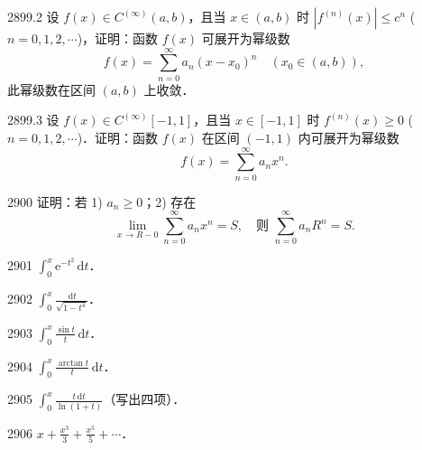 \begin{prob}[M]{2899.2}
设 $f(x) \in C^{(\infty)}(a, b)$，且当 $x \in (a, b)$ 时 $|f^{(n)}(x)| \leqslant c^n$ ($n = 0, 1, 2, \cdots$)，证明：函数 $f(x)$ 可展开为幂级数
\[
f(x) = \sum_{n=0}^{\infty} a_n (x - x_0)^n \quad (x_0 \in (a, b)),
\]
此幂级数在区间 $(a, b)$ 上收敛．
\end{prob}

\begin{prob}[M]{2899.3}
设 $f(x) \in C^{(\infty)}[-1, 1]$，且当 $x \in [-1, 1]$ 时 $f^{(n)}(x) \geqslant 0$ ($n = 0, 1, 2, \cdots$)．证明：函数 $f(x)$ 在区间 $(-1, 1)$ 内可展开为幂级数
\[
f(x) = \sum_{n=0}^{\infty} a_n x^n.
\]
\end{prob}

\begin{prob}[M]{2900}
证明：若 1) $a_n \geqslant 0$；2) 存在
\[
\lim_{x \to R - 0} \sum_{n=0}^{\infty} a_n x^n = S, \quad \text{则 } \sum_{n=0}^{\infty} a_n R^n = S.
\]
\end{prob}


\begin{prob}[S]{2901}
$\displaystyle \int_0^x \mathrm{e}^{-t^2} \,\mathrm{d}t$．
\end{prob}

\begin{prob}[S]{2902}
$\displaystyle \int_0^x \frac{\,\mathrm{d}t}{\sqrt{1 - t^4}}$．
\end{prob}

\begin{prob}[S]{2903}
$\displaystyle \int_0^x \frac{\sin t}{t} \,\mathrm{d}t$．
\end{prob}

\begin{prob}[S]{2904}
$\displaystyle \int_0^x \frac{\arctan t}{t} \,\mathrm{d}t$．
\end{prob}

\begin{prob}[S]{2905}
$\displaystyle \int_0^x \frac{t \,\mathrm{d}t}{\ln(1 + t)}$（写出四项）．
\end{prob}


\begin{prob}[S]{2906}
$\displaystyle x + \frac{x^3}{3} + \frac{x^5}{5} + \cdots$．
\end{prob}

